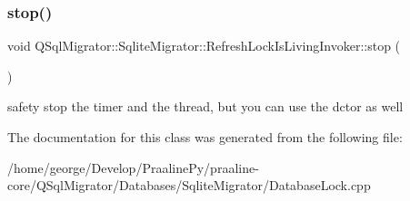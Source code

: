 \subsubsection{\texorpdfstring{stop()}{stop()}}
{\footnotesize\ttfamily void Q\+Sql\+Migrator\+::\+Sqlite\+Migrator\+::\+Refresh\+Lock\+Is\+Living\+Invoker\+::stop (\begin{DoxyParamCaption}{ }\end{DoxyParamCaption})}

safety stop the timer and the thread, but you can use the dctor as well 

The documentation for this class was generated from the following file\+:\begin{DoxyCompactItemize}
\item 
/home/george/\+Develop/\+Praaline\+Py/praaline-\/core/\+Q\+Sql\+Migrator/\+Databases/\+Sqlite\+Migrator/Database\+Lock.\+cpp\end{DoxyCompactItemize}
